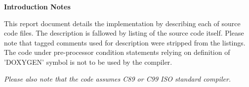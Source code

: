 {\bfseries Introduction Notes}

This report document details the implementation by describing each of source code files. The description is fallowed by listing of the source code itself. Please note that tagged comments used for description were stripped from the listings. The code under pre-\/processor condition statements relying on definition of 'DOXYGEN' symbol is not to be used by the compiler.

{\itshape Please also note that the code assumes C89 or C99 ISO standard compiler.\/} 